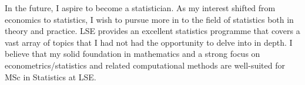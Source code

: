 In the future, I aspire to become a statistician.
As my interest shifted from economics to statistics,
I wish to pursue more in to the field of statistics both in theory and practice.
LSE provides an excellent statistics programme that covers a vast array of topics
that I had not had the opportunity to delve into in depth.
I believe that my solid foundation in mathematics and a strong focus on econometrics/statistics and related computational methods
are well-suited for MSc in Statistics at LSE.
